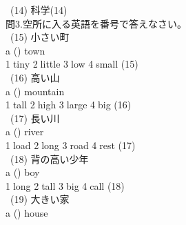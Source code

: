\documentclass[uplatex]{jsarticle}
\begin{document}
\ (14) 科学\hspace{\fill}(14)\underline{\hspace{35mm}}\\
\Large 問3.空所に入る英語を番号で答えなさい。\\
\large\ (15) 小さい町\\
\hspace{10mm}a (\hspace{10mm}) town\\
\hspace{10mm}\textcircled{\normalsize1}tiny \textcircled{\normalsize2}little \textcircled{\normalsize3}low \textcircled{\normalsize4}small 
\hspace{\fill}(15)\underline{\hspace{35mm}}\\
\ (16) 高い山\\
\hspace{10mm}a (\hspace{10mm}) mountain\\
\hspace{10mm}\textcircled{\normalsize1}tall \textcircled{\normalsize2}high \textcircled{\normalsize3}large \textcircled{\normalsize4}big 
\hspace{\fill}(16)\underline{\hspace{35mm}}\\
\ (17) 長い川\\
\hspace{10mm}a (\hspace{10mm}) river\\
\hspace{10mm}\textcircled{\normalsize1}load \textcircled{\normalsize2}long \textcircled{\normalsize3}road \textcircled{\normalsize4}rest 
\hspace{\fill}(17)\underline{\hspace{35mm}}\\
\ (18) 背の高い少年\\
\hspace{10mm}a (\hspace{10mm}) boy\\
\hspace{10mm}\textcircled{\normalsize1}long \textcircled{\normalsize2}tall \textcircled{\normalsize3}big \textcircled{\normalsize4}call 
\hspace{\fill}(18)\underline{\hspace{35mm}}\\
\ (19) 大きい家\\
\hspace{10mm}a (\hspace{10mm}) house\\
\end{document}
